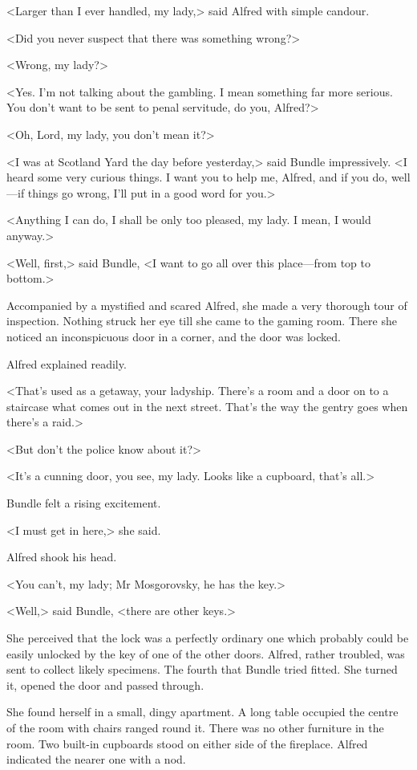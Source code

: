<Larger than I ever handled, my lady,> said Alfred with simple candour.

<Did you never suspect that there was something wrong?>

<Wrong, my lady?>

<Yes. I'm not talking about the gambling. I mean something far more serious. You don't want to be sent to penal servitude, do you, Alfred?>

<Oh, Lord, my lady, you don't mean it?>

<I was at Scotland Yard the day before yesterday,> said Bundle impressively. <I heard some very curious things. I want you to help me, Alfred, and if you do, well—if things go wrong, I'll put in a good word for you.>

<Anything I can do, I shall be only too pleased, my lady. I mean, I would anyway.>

<Well, first,> said Bundle, <I want to go all over this place—from top to bottom.>

Accompanied by a mystified and scared Alfred, she made a very thorough tour of inspection. Nothing struck her eye till she came to the gaming room. There she noticed an inconspicuous door in a corner, and the door was locked.

Alfred explained readily.

<That's used as a getaway, your ladyship. There's a room and a door on to a staircase what comes out in the next street. That's the way the gentry goes when there's a raid.>

<But don't the police know about it?>

<It's a cunning door, you see, my lady. Looks like a cupboard, that's all.>

Bundle felt a rising excitement.

<I must get in here,> she said.

Alfred shook his head.

<You can't, my lady; Mr Mosgorovsky, he has the key.>

<Well,> said Bundle, <there are other keys.>

She perceived that the lock was a perfectly ordinary one which probably could be easily unlocked by the key of one of the other doors. Alfred, rather troubled, was sent to collect likely specimens. The fourth that Bundle tried fitted. She turned it, opened the door and passed through.

She found herself in a small, dingy apartment. A long table occupied the centre of the room with chairs ranged round it. There was no other furniture in the room. Two built-in cupboards stood on either side of the fireplace. Alfred indicated the nearer one with a nod.


